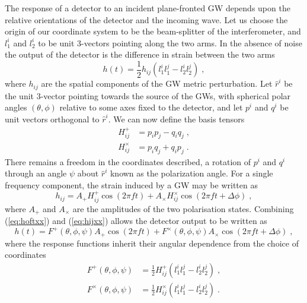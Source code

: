 The response of a detector to an incident plane-fronted GW depends upon the relative orientations of the detector and the incoming wave. Let us choose the origin of our coordinate system to be the beam-splitter of the interferometer, and $l_{1}^{i}$ and $l_{2}^{i}$ to be unit 3-vectors pointing along the two arms. In the absence of noise the output of the detector is the difference in strain between the two arms \citep{Thorne1987}
\begin{equation}\label{eq:hoftxx}
h(t)=\frac{1}{2}h_{ij}\left( l_{1}^{i}l_{1}^{j}-l_{2}^{i}l_{2}^{j} \right)\; ,
\end{equation}
where $h_{ij}$ are the spatial components of the GW metric perturbation. Let $\hat{r}^{i}$ be the unit 3-vector pointing towards the source of the GWs, with spherical polar angles $(\theta,\phi)$ relative to some axes fixed to the detector, and let $p^{i}$ and $q^{i}$ be unit vectors orthogonal to $\hat{r}^{i}$. We can now define the basis tensors
\begin{eqnarray}
H^{+}_{ij}&=p_{i}p_{j}-q_{i}q_{j} \; , \\
H^{\times}_{ij}&=p_{i}q_{j}+q_{i}p_{j} \; .
\end{eqnarray}
There remains a freedom in the coordinates described, a rotation of $p^{i}$ and $q^{i}$ through an angle $\psi$ about $\hat{r}^{i}$ known as the polarization angle. For a single frequency component, the strain induced by a GW may be written as
\begin{equation}\label{eq:hijxx}
h_{ij}=A_{+}H^{+}_{ij}\cos\left(2\pi ft\right)+A_{\times}H^{\times}_{ij}\cos\left(2\pi ft+\Delta \phi\right) \; ,
\end{equation}
where $A_{+}$ and $A_{\times}$ are the amplitudes of the two polarisation states. Combining (\ref{eq:hoftxx}) and (\ref{eq:hijxx}) allows the detector output to be written as
\begin{equation}
h(t)=F^{+}(\theta,\phi,\psi)A_{+}\cos\left(2\pi ft\right)+F^{\times}(\theta,\phi,\psi)A_{\times}\cos\left(2\pi f t + \Delta\phi \right)\; ,
\end{equation}
where the response functions inherit their angular dependence from the choice of coordinates
\begin{eqnarray}\label{eq:responsefuncs}
F^{+}(\theta,\phi,\psi)&=\frac{1}{2}H^{+}_{ij}\left(l_{1}^{i}l_{1}^{j}-l_{2}^{i}l_{2}^{j}\right) \; , \\
F^{\times}(\theta,\phi,\psi)&=\frac{1}{2}H^{\times}_{ij}\left(l_{1}^{i}l_{1}^{j}-l_{2}^{i}l_{2}^{j}\right) \; . 
\end{eqnarray}

